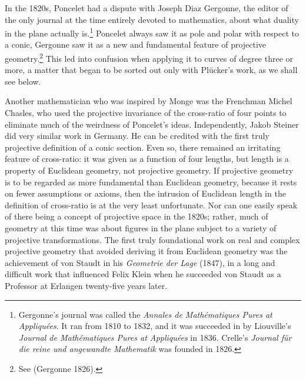 In the 1820s, Poncelet had a dispute with Joseph Diaz Gergonne, the editor of the only journal at the time entirely devoted to mathematics, about what duality in the plane actually is.\footnote{Gergonne's journal was called the \emph{Annales de Math\'ematiques Pures at Appliqu\'ees}. It ran from 1810 to 1832, and  it was succeeded in by Liouville's \emph{Journal de Math\'ematiques Pures at Appliqu\'ees} in 1836. Crelle's \emph{Journal f\"ur die reine und angewandte Mathematik} was founded in 1826.}
Poncelet always saw it as pole and polar with respect to a conic, Gergonne saw it as a new and fundamental feature of projective geometry.\footnote{See (Gergonne 1826).} This led into confusion when applying it to curves of degree three or more, a matter that began to be sorted out only with Pl\"ucker's work, as we shall see below.


Another mathematician who was inspired by Monge was the Frenchman Michel Chasles, who used the projective invariance of the cross-ratio of four points to eliminate much of the weirdness of Poncelet's ideas. Independently, Jakob Steiner did very similar work in Germany. He can be credited with the first truly projective definition of a conic section. Even so, there remained an irritating feature of cross-ratio: it was given as a function of four lengths, but length is a property of Euclidean geometry, not projective geometry.  If projective geometry is to be regarded as more fundamental than Euclidean geometry, because it rests on fewer assumptions or axioms, then the intrusion of Euclidean length in the definition of cross-ratio is at the very least unfortunate. Nor can one easily speak of there being a concept of projective space in the 1820s; rather, much of geometry at this time was about figures in the plane subject to a variety of projective transformations. The first truly foundational work on real and complex projective geometry that avoided deriving it from Euclidean geometry was the achievement of von Staudt in his \emph{Geometrie der Lage} (1847), in a long and difficult work that influenced Felix Klein when he succeeded von Staudt as a Professor at Erlangen twenty-five years later. 

